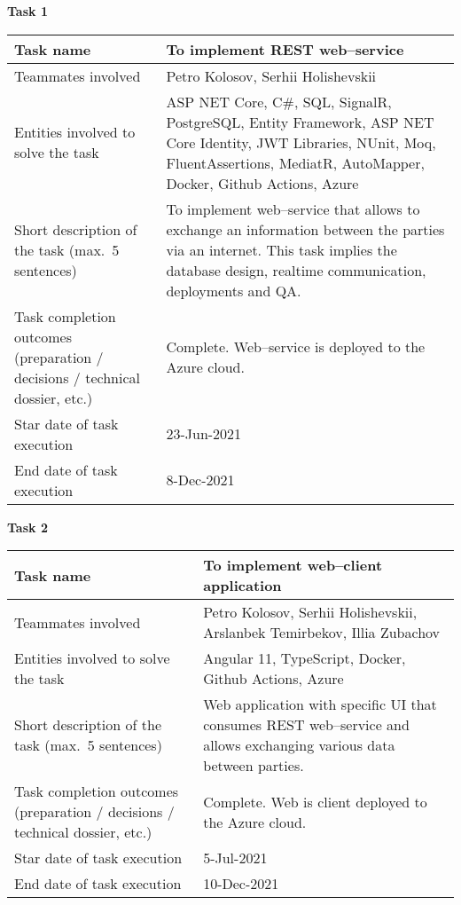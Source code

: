 \textbf{Task 1}\\
\begin{tabular}{|p{}|p{}|}
    \hline
    Task name                   & To implement REST web--service     \\
    \hline
    Teammates involved          & Petro Kolosov, Serhii Holishevskii \\
    \hline
    Entities involved to solve the task & ASP NET Core, C\#, SQL, SignalR, PostgreSQL,
    Entity Framework, ASP NET Core Identity,
    JWT Libraries, NUnit, Moq, FluentAssertions, MediatR, AutoMapper, Docker, Github Actions, Azure \\
    \hline
    Short description of the task (max.\ 5 sentences) &
    To implement web--service that allows to exchange an information between the parties via an internet.
    This task implies the database design, realtime communication, deployments and QA. \\
    \hline
    Task completion outcomes (preparation / decisions / technical dossier, etc.) & Complete.
    Web--service is deployed to the Azure cloud. \\
    \hline
    Star date of task execution & 23-Jun-2021                        \\
    \hline
    End date of task execution  & 8-Dec-2021                         \\
    \hline
\end{tabular}
\vskip 5mm
\hspace*{-6mm}\textbf{Task 2}\\
\begin{tabular}{|p{}|p{}|}
    \hline
    Task name                           & To implement web--client application                                     \\
    \hline
    Teammates involved                  & Petro Kolosov, Serhii Holishevskii, Arslanbek Temirbekov, Illia Zubachov \\
    \hline
    Entities involved to solve the task & Angular 11, TypeScript, Docker, Github Actions, Azure                    \\
    \hline
    Short description of the task (max.\ 5 sentences) &
    Web application with specific UI that consumes REST web--service and allows exchanging various data between parties. \\
    \hline
    Task completion outcomes (preparation / decisions / technical dossier, etc.) & Complete.
    Web is client deployed to the Azure cloud. \\
    \hline
    Star date of task execution         & 5-Jul-2021                                                               \\
    \hline
    End date of task execution          & 10-Dec-2021                                                              \\
    \hline
\end{tabular}
